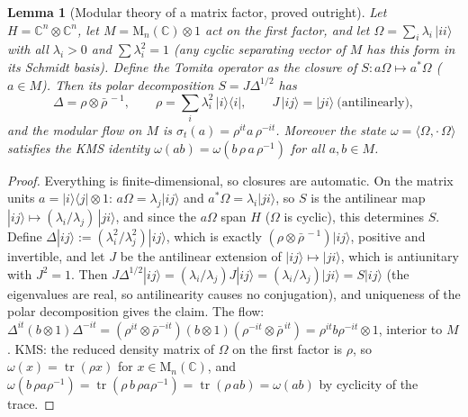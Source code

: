 \documentclass[11pt]{article}
\newtheorem{lemma}[theorem]{Lemma}
\theoremstyle{definition}
\theoremstyle{plain}
\providecommand{\C}{}\renewcommand{\C}{\mathbb{C}}
\providecommand{\Mat}{}\renewcommand{\Mat}{\mathrm{M}}
\providecommand{\tr}{}\renewcommand{\tr}{\operatorname{tr}}
\begin{document}
\begin{lemma}[Modular theory of a matrix factor, proved outright]\label{c:singularity.modular-theory-matrix-factor-proved-outright}
Let $H = \C^n \otimes \C^n$, let $M = \Mat_n(\C) \otimes 1$ act on the first factor, and let $\Omega = \sum_i \lambda_i\, |ii\rangle$ with all $\lambda_i > 0$ and $\sum \lambda_i^2 = 1$ (any cyclic separating vector of $M$ has this form in its Schmidt basis). Define the Tomita operator as the closure of $S : a\Omega \mapsto a^*\Omega$ ($a \in M$). Then its polar decomposition $S = J\Delta^{1/2}$ has
\[
\Delta = \rho \otimes \bar\rho^{\,-1}, \qquad \rho = \sum_i \lambda_i^2\,|i\rangle\langle i| , \qquad J\,|ij\rangle = |ji\rangle \ \text{(antilinearly)},
\]
and the modular flow on $M$ is $\sigma_t(a) = \rho^{it} a\, \rho^{-it}$. Moreover the state $\omega = \langle\Omega, \cdot\,\Omega\rangle$ satisfies the KMS identity $\omega(ab) = \omega(b\,\rho\,a\,\rho^{-1})$ for all $a, b \in M$.
\end{lemma}
\begin{proof}
Everything is finite-dimensional, so closures are automatic. On the matrix units $a = |i\rangle\langle j| \otimes 1$: $a\Omega = \lambda_j |ij\rangle$ and $a^*\Omega = \lambda_i |ji\rangle$, so $S$ is the antilinear map $|ij\rangle \mapsto (\lambda_i/\lambda_j)\,|ji\rangle$, and since the $a\Omega$ span $H$ ($\Omega$ is cyclic), this determines $S$. Define $\Delta |ij\rangle := (\lambda_i^2/\lambda_j^2)|ij\rangle$, which is exactly $(\rho \otimes \bar\rho^{\,-1})|ij\rangle$, positive and invertible, and let $J$ be the antilinear extension of $|ij\rangle \mapsto |ji\rangle$, which is antiunitary with $J^2 = 1$. Then $J\Delta^{1/2}|ij\rangle = (\lambda_i/\lambda_j) J|ij\rangle = (\lambda_i/\lambda_j)|ji\rangle = S|ij\rangle$ (the eigenvalues are real, so antilinearity causes no conjugation), and uniqueness of the polar decomposition gives the claim. The flow: $\Delta^{it}(b \otimes 1)\Delta^{-it} = (\rho^{it}\otimes\bar\rho^{-it})(b \otimes 1)(\rho^{-it}\otimes\bar\rho^{\,it}) = \rho^{it} b \rho^{-it} \otimes 1$, interior to $M$. KMS: the reduced density matrix of $\Omega$ on the first factor is $\rho$, so $\omega(x) = \tr(\rho x)$ for $x \in \Mat_n(\C)$, and $\omega(b\,\rho a \rho^{-1}) = \tr(\rho\, b\, \rho a \rho^{-1}) = \tr(\rho\, a b) = \omega(ab)$ by cyclicity of the trace.

\end{proof}
\end{document}
